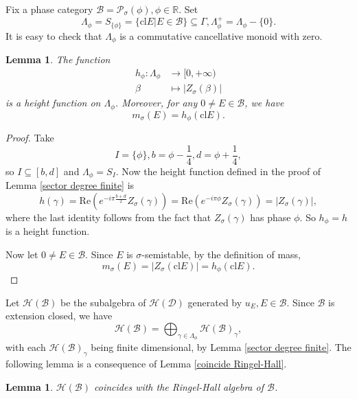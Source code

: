 \documentclass[a4paper,12pt]{amsart}
\numberwithin{equation}{section}
\newtheorem{lemma}[theorem]{Lemma}
\newcommand{\re}{\mathrm{Re}}
\newcommand{\cl}{\mathrm{cl}}
\newcommand{\1}{\mathbf{1}}
\begin{document}
Fix a phase category $\mathcal{B}=\mathcal{P}_\sigma(\phi),\phi\in\mathbb{R}$. Set
\[\Lambda_\phi=S_{\{\phi\}}=\{\cl E|E\in\mathcal{B}\}\subseteq\Gamma,\Lambda_\phi^+=\Lambda_\phi-\{0\}.\]
It is easy to check that $\Lambda_\phi$ is a commutative cancellative monoid with zero.
\begin{lemma}
    The function
    \begin{align*}
        h_\phi:\Lambda_\phi&\rightarrow[0,+\infty)\\
        \beta&\mapsto|Z_\sigma(\beta)|
    \end{align*}
    is a height function on $\Lambda_\phi$. Moreover, for any $0\neq E\in\mathcal{B}$, we have
    \[m_\sigma(E)=h_\phi(\cl E).\]
\end{lemma}
\begin{proof}
    Take
    \[I=\{\phi\},b=\phi-\dfrac14,d=\phi+\dfrac14,\]
    so $I\subseteq[b,d]$ and $\Lambda_\phi=S_I$. Now the height function defined in the proof of Lemma \ref{sector degree finite} is
    \[h(\gamma)=\re(e^{-i\pi\frac{b+d}{2}}Z_\sigma(\gamma))=\re(e^{-i\pi\phi}Z_\sigma(\gamma))=|Z_{\sigma}(\gamma)|,\]
    where the last identity follows from the fact that $Z_{\sigma}(\gamma)$ has phase $\phi$. So $h_\phi=h$ is a height function.

    Now let $0\neq E\in\mathcal{B}$. Since $E$ is $\sigma$-semistable, by the definition of mass, 
    \[m_\sigma(E)=|Z_\sigma(\cl E)|=h_\phi(\cl E).\]
\end{proof}

Let $\mathcal{H}(\mathcal{B})$ be the subalgebra of $\mathcal{H}(\mathcal{D})$ generated by $u_E,E\in\mathcal{B}$. Since $\mathcal{B}$ is extension closed, we have
\[\mathcal{H}(\mathcal{B})=\bigoplus_{\gamma\in\Lambda_\phi}\mathcal{H}(\mathcal{B})_\gamma,\]
with each $\mathcal{H}(\mathcal{B})_\gamma$ being finite dimensional, by Lemma \ref{sector degree finite}. The following lemma is a consequence of Lemma \ref{coincide Ringel-Hall}.
\begin{lemma}
    $\mathcal{H}(\mathcal{B})$ coincides with the Ringel-Hall algebra of $\mathcal{B}$.
\end{lemma}
\end{document}
